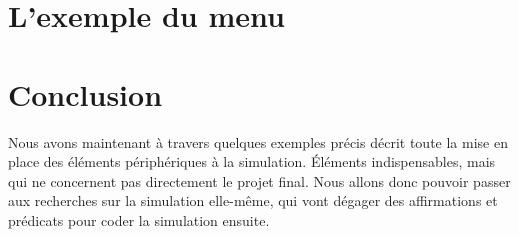 \section{L'exemple du menu}
  
  
\section{Conclusion}
  Nous avons maintenant à travers quelques exemples précis décrit toute la mise en place des éléments périphériques à la simulation. Éléments indispensables, mais qui ne concernent pas directement le projet final. Nous allons donc pouvoir passer aux recherches sur la simulation elle-même, qui vont dégager des affirmations et prédicats pour coder la simulation ensuite.
    
    
    
     
